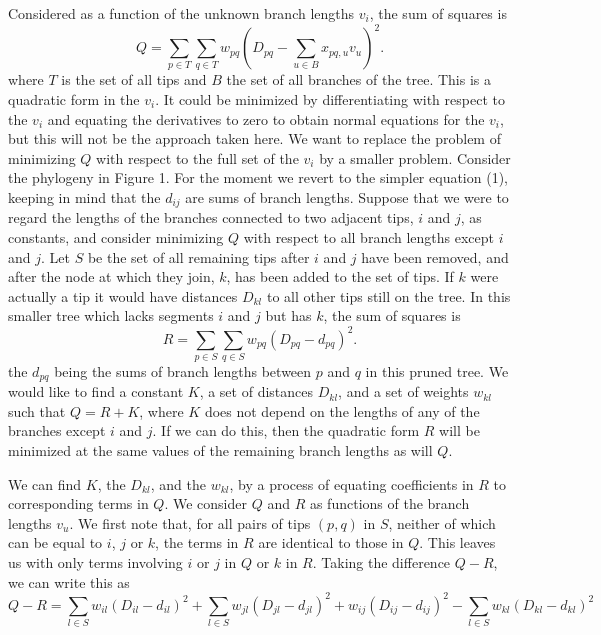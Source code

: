 \documentclass[12pt]{article}
\begin{document}
Considered as a function of the unknown branch lengths $v_i$, the sum of
squares is
\begin{equation}
  Q   =   \sum_{p\in T}  \sum_{q\in T} w_{pq} (D_{pq}  -  \sum_{u\in B} x_{pq,u} v_u )^2.
\end{equation}
where $T$ is the set of all tips and $B$ the set of all branches of the tree.
This is a quadratic form in the $v_i$.  It could be minimized by
differentiating with respect to the $v_i$ and equating the derivatives to
zero to obtain normal equations for the $v_i$, but this will not be the
approach taken here.
We want to replace the problem of minimizing $Q$ with respect to the full set
of the $v_i$ by a smaller problem.  Consider the phylogeny in Figure 1.
For the moment we revert to the simpler equation (1), keeping in mind that
the $d_{ij}$ are sums of branch lengths.  Suppose that we were to regard the 
lengths of the branches connected to two adjacent tips, $i$ and $j$, as constants, 
and consider minimizing $Q$ with respect to all branch lengths except $i$ and 
$j$.  Let $S$ be the set of all remaining tips after $i$ and $j$ have been removed, 
and after the node at
which they join, $k$, has been added to the set of tips.  If $k$ were actually 
a tip it
would have distances $D_{kl}$ to all other tips still on the tree.  In this
smaller tree which lacks segments $i$ and $j$ but has $k$, the sum of squares is 
\begin{equation}
  R   =   \sum_{p\in S}  \sum_{q\in S} w_{pq} (D_{pq}  -  d_{pq})^2.
\end{equation}
\noindent
the $d_{pq}$ being the sums of branch lengths between $p$ and $q$ in this pruned 
tree.  We would like to find a constant $K$, a set of distances $D_{kl}$, and 
a set of weights $w_{kl}$ such that
$Q = R + K$, where $K$ does not depend on the lengths of any of the branches
except $i$ and $j$.  If we can do this, then the quadratic form $R$ will be
minimized at the same values of the remaining branch lengths as will $Q$.

We can find $K$, the $D_{kl}$, and the $w_{kl}$, by a process of equating
coefficients in $R$ to corresponding terms in $Q$.  We consider $Q$ and $R$
as functions of the branch lengths $v_u$.  We first note that, for all
pairs of tips $(p, q)$ in $S$, neither of which can be equal to $i$, $j$ or $k$, the 
terms 
in $R$ are identical to those in $Q$.  This leaves us with only terms involving $i$ 
or $j$ in $Q$ or $k$ in $R$.  Taking the difference $Q - R$, we can write this as
\begin{equation}
        Q  -  R   =   \sum_{l\in S} w_{il} (D_{il} - d_{il})^2  +  \sum_{l\in S} w_{jl} (D_{jl} - d_{jl})^2 +  w_{ij} (D_{ij} - d_{ij})^2  -  \sum_{l\in S} w_{kl} (D_{kl} - d_{kl})^2
\end{equation}
\end{document}
